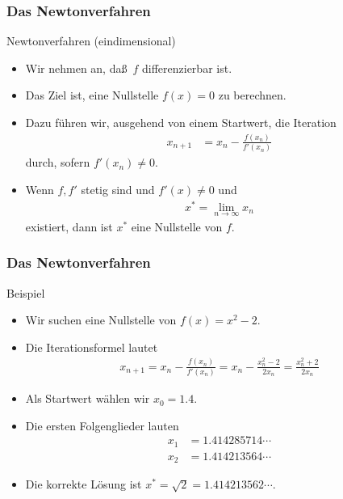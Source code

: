 \documentclass{beamer}
\renewcommand{\ae}{\"a}
\renewcommand{\oe}{\"o}
\newcommand{\ue}{\"u}
\newcommand{\mytitle}{Das Newtonverfahren}
\begin{document}
\begin{frame}\frametitle{\mytitle}
	\begin{block}{Newtonverfahren (eindimensional)}
		\begin{itemize}
			\item Wir nehmen an, da\ss\ $f$ differenzierbar ist.
			\item Das Ziel ist, eine Nullstelle $f(x)=0$ zu berechnen.
			\item Dazu f\ue hren wir, ausgehend von einem Startwert, die Iteration
				\begin{align*}
					x_{n+1}&=x_n-\frac{f(x_n)}{f'(x_n)}
				\end{align*}
				durch, sofern $f'(x_n)\neq0$.
			\item Wenn $f,f'$ stetig sind und $f'(x)\neq0$ und
				\begin{align*}
					x^*=\lim_{n\to\infty}x_n
				\end{align*}
				existiert, dann ist $x^*$ eine Nullstelle von $f$.
		\end{itemize}
	\end{block}
\end{frame}

\begin{frame}\frametitle{\mytitle}
	\begin{block}{Beispiel}
		\begin{itemize}
			\item Wir suchen eine Nullstelle von $f(x)=x^2-2$.
			\item Die Iterationsformel lautet
				\begin{align*}
					x_{n+1}=x_n-\frac{f(x_n)}{f'(x_n)}=x_n-\frac{x_n^2-2}{2x_n}=\frac{x_n^2+2}{2x_n}
				\end{align*}
			\item Als Startwert w\ae hlen wir $x_0=1.4$.
			\item Die ersten Folgenglieder lauten
				\begin{align*}
					x_1&=1.414285714\cdots\\
					x_2&=1.414213564\cdots
				\end{align*}
			\item Die korrekte L\oe sung ist $x^*=\sqrt2 =1.414213562\cdots$.
		\end{itemize}
	\end{block}
\end{frame}
\end{document}
